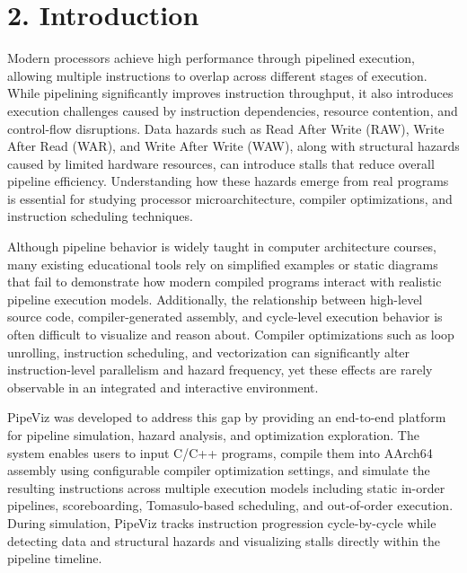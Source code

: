 \section*{2. Introduction}

Modern processors achieve high performance through pipelined execution, allowing multiple instructions to overlap across different stages of execution. While pipelining significantly improves instruction throughput, it also introduces execution challenges caused by instruction dependencies, resource contention, and control-flow disruptions. Data hazards such as Read After Write (RAW), Write After Read (WAR), and Write After Write (WAW), along with structural hazards caused by limited hardware resources, can introduce stalls that reduce overall pipeline efficiency. Understanding how these hazards emerge from real programs is essential for studying processor microarchitecture, compiler optimizations, and instruction scheduling techniques.

Although pipeline behavior is widely taught in computer architecture courses, many existing educational tools rely on simplified examples or static diagrams that fail to demonstrate how modern compiled programs interact with realistic pipeline execution models. Additionally, the relationship between high-level source code, compiler-generated assembly, and cycle-level execution behavior is often difficult to visualize and reason about. Compiler optimizations such as loop unrolling, instruction scheduling, and vectorization can significantly alter instruction-level parallelism and hazard frequency, yet these effects are rarely observable in an integrated and interactive environment.

PipeViz was developed to address this gap by providing an end-to-end platform for pipeline simulation, hazard analysis, and optimization exploration. The system enables users to input C/C++ programs, compile them into AArch64 assembly using configurable compiler optimization settings, and simulate the resulting instructions across multiple execution models including static in-order pipelines, scoreboarding, Tomasulo-based scheduling, and out-of-order execution. During simulation, PipeViz tracks instruction progression cycle-by-cycle while detecting data and structural hazards and visualizing stalls directly within the pipeline timeline.

